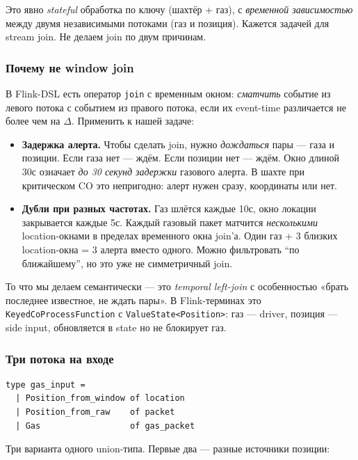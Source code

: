 Это явно \emph{stateful} обработка по ключу (шахтёр + газ), с
\emph{временной зависимостью} между двумя независимыми потоками
(газ и позиция). Кажется задачей для stream join. Не делаем join по
двум причинам.

\subsubsection{Почему не window join}

В Flink-DSL есть оператор \texttt{join} с временным окном:
\emph{сматчить} событие из левого потока с событием из правого
потока, если их event-time различается не более чем на $\Delta$.
Применить к нашей задаче:

\begin{itemize}
\item \textbf{Задержка алерта.} Чтобы сделать join, нужно
\emph{дождаться} пары --- газа и позиции. Если газа нет --- ждём.
Если позиции нет --- ждём. Окно длиной 30с означает \emph{до 30
секунд задержки} газового алерта. В шахте при критическом CO это
непригодно: алерт нужен сразу, координаты или нет.

\item \textbf{Дубли при разных частотах.} Газ шлётся каждые 10с,
окно локации закрывается каждые 5с. Каждый газовый пакет матчится
\emph{несколькими} location-окнами в пределах временного окна
join'а. Один газ + 3 близких location-окна = 3 алерта вместо одного.
Можно фильтровать ``по ближайшему'', но это уже не симметричный
join.
\end{itemize}

То что мы делаем семантически --- это \emph{temporal left-join} с
особенностью «брать последнее известное, не ждать пары».
В Flink-терминах это \texttt{KeyedCoProcessFunction} с
\texttt{ValueState<Position>}: газ --- driver, позиция --- side input,
обновляется в state но не блокирует газ.

\subsubsection{Три потока на входе}

\begin{lstlisting}
type gas_input =
  | Position_from_window of location
  | Position_from_raw    of packet
  | Gas                  of gas_packet
\end{lstlisting}

Три варианта одного union-типа. Первые два --- разные источники
позиции:


